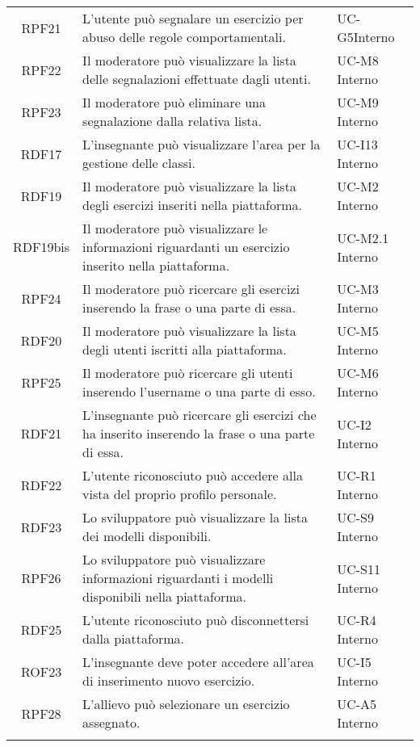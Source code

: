 \begin{tabularx}{\textwidth}{| c | p{10cm} | X |}
		RPF21 & L'utente può segnalare un esercizio per abuso delle regole comportamentali. & UC-G5\newline Interno\\
		RPF22 & Il moderatore può visualizzare la lista delle segnalazioni effettuate dagli utenti. & UC-M8 \newline Interno\\
		RPF23 & Il moderatore può eliminare una segnalazione dalla relativa lista. & UC-M9 \newline Interno\\
		RDF17 & L'insegnante può visualizzare l'area per la gestione delle classi. & UC-I13 \newline Interno\\
		RDF19 & Il moderatore può visualizzare la lista degli esercizi inseriti nella piattaforma. & UC-M2 \newline Interno\\
		RDF19bis & Il moderatore può visualizzare le informazioni riguardanti un esercizio inserito nella piattaforma. & UC-M2.1 \newline Interno\\
		RPF24 & Il moderatore può ricercare gli esercizi inserendo la frase o una parte di essa. & UC-M3 \newline Interno\\
		RDF20 & Il moderatore può visualizzare la lista degli utenti iscritti alla piattaforma. & UC-M5 \newline Interno\\
		RPF25 & Il moderatore può ricercare gli utenti inserendo l'username o una parte di esso. & UC-M6 \newline Interno\\
		RDF21 & L'insegnante può ricercare gli esercizi che ha inserito inserendo la frase o una parte di essa. & UC-I2 \newline Interno\\
		RDF22 & L'utente riconosciuto può accedere alla vista del proprio profilo personale. & UC-R1 \newline Interno\\
		RDF23 & Lo sviluppatore può visualizzare la lista dei modelli disponibili. & UC-S9 \newline Interno\\
		RPF26 & Lo sviluppatore può visualizzare informazioni riguardanti i modelli disponibili nella piattaforma. & UC-S11 \newline Interno\\
		RDF25 & L'utente riconosciuto può disconnettersi dalla piattaforma. & UC-R4 \newline Interno\\
		ROF23 & L'insegnante deve poter accedere all'area di inserimento nuovo esercizio. & UC-I5 \newline Interno\\
		RPF28 & L'allievo può selezionare un esercizio assegnato. & UC-A5 \newline Interno\\
		\hline
		\caption{Tabella dei requisiti funzionali}
\end{tabularx}

